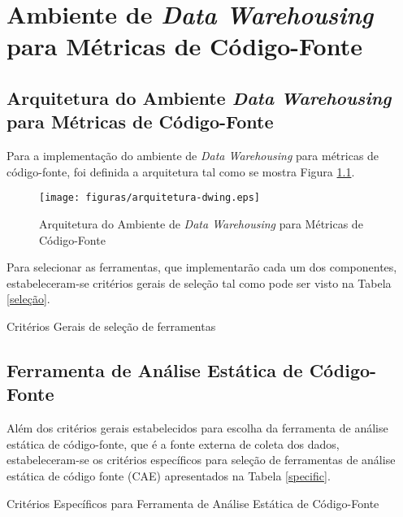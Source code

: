 \chapter{Ambiente de \textit{Data Warehousing} para Métricas de Código-Fonte}
\label{chap:arquitetura}

\section{Arquitetura do Ambiente \textit{Data Warehousing} para Métricas de Código-Fonte}
Para a implementação do ambiente de \textit{Data Warehousing} para métricas de código-fonte, foi definida a arquitetura tal como se mostra Figura \ref{arquitetura}.

\begin{figure}[ht!]
\centering
\texttt{[image: figuras/arquitetura-dwing.eps]}
\caption{Arquitetura do Ambiente de \textit{Data Warehousing} para Métricas de Código-Fonte}
\label{arquitetura}
\end{figure}
\FloatBarrier

Para selecionar as ferramentas, que implementarão cada um dos componentes, estabeleceram-se critérios gerais de seleção tal como pode ser visto na Tabela \ref{seleção}.


	\begin{table}[!ht]
	\begin{center}
	
	\caption{Critérios Gerais de seleção de ferramentas}
	\label{seleção}
	\end{center}
	\end{table}	


\section{Ferramenta de Análise Estática de Código-Fonte}

Além dos critérios gerais estabelecidos para escolha da ferramenta de análise estática de código-fonte, que é a fonte externa de coleta dos dados, estabeleceram-se os critérios específicos para seleção de ferramentas de análise estática de código fonte (CAE) apresentados na Tabela \ref{specific}.


	\begin{table}[!ht]
	\begin{center}
		
	\caption{Critérios Específicos para Ferramenta de Análise Estática de Código-Fonte}
	\label{specific}
	\end{center}
	\end{table}	

